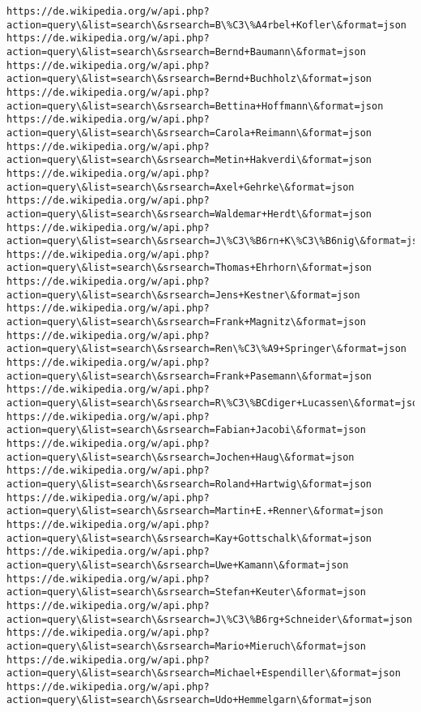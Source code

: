 \documentclass[11pt]{article}
\begin{document}
\begin{Verbatim}[commandchars=\\\{\}]
https://de.wikipedia.org/w/api.php?action=query\&list=search\&srsearch=B\%C3\%A4rbel+Kofler\&format=json
https://de.wikipedia.org/w/api.php?action=query\&list=search\&srsearch=Bernd+Baumann\&format=json
https://de.wikipedia.org/w/api.php?action=query\&list=search\&srsearch=Bernd+Buchholz\&format=json
https://de.wikipedia.org/w/api.php?action=query\&list=search\&srsearch=Bettina+Hoffmann\&format=json
https://de.wikipedia.org/w/api.php?action=query\&list=search\&srsearch=Carola+Reimann\&format=json
https://de.wikipedia.org/w/api.php?action=query\&list=search\&srsearch=Metin+Hakverdi\&format=json
https://de.wikipedia.org/w/api.php?action=query\&list=search\&srsearch=Axel+Gehrke\&format=json
https://de.wikipedia.org/w/api.php?action=query\&list=search\&srsearch=Waldemar+Herdt\&format=json
https://de.wikipedia.org/w/api.php?action=query\&list=search\&srsearch=J\%C3\%B6rn+K\%C3\%B6nig\&format=json
https://de.wikipedia.org/w/api.php?action=query\&list=search\&srsearch=Thomas+Ehrhorn\&format=json
https://de.wikipedia.org/w/api.php?action=query\&list=search\&srsearch=Jens+Kestner\&format=json
https://de.wikipedia.org/w/api.php?action=query\&list=search\&srsearch=Frank+Magnitz\&format=json
https://de.wikipedia.org/w/api.php?action=query\&list=search\&srsearch=Ren\%C3\%A9+Springer\&format=json
https://de.wikipedia.org/w/api.php?action=query\&list=search\&srsearch=Frank+Pasemann\&format=json
https://de.wikipedia.org/w/api.php?action=query\&list=search\&srsearch=R\%C3\%BCdiger+Lucassen\&format=json
https://de.wikipedia.org/w/api.php?action=query\&list=search\&srsearch=Fabian+Jacobi\&format=json
https://de.wikipedia.org/w/api.php?action=query\&list=search\&srsearch=Jochen+Haug\&format=json
https://de.wikipedia.org/w/api.php?action=query\&list=search\&srsearch=Roland+Hartwig\&format=json
https://de.wikipedia.org/w/api.php?action=query\&list=search\&srsearch=Martin+E.+Renner\&format=json
https://de.wikipedia.org/w/api.php?action=query\&list=search\&srsearch=Kay+Gottschalk\&format=json
https://de.wikipedia.org/w/api.php?action=query\&list=search\&srsearch=Uwe+Kamann\&format=json
https://de.wikipedia.org/w/api.php?action=query\&list=search\&srsearch=Stefan+Keuter\&format=json
https://de.wikipedia.org/w/api.php?action=query\&list=search\&srsearch=J\%C3\%B6rg+Schneider\&format=json
https://de.wikipedia.org/w/api.php?action=query\&list=search\&srsearch=Mario+Mieruch\&format=json
https://de.wikipedia.org/w/api.php?action=query\&list=search\&srsearch=Michael+Espendiller\&format=json
https://de.wikipedia.org/w/api.php?action=query\&list=search\&srsearch=Udo+Hemmelgarn\&format=json

\end{Verbatim}
\end{document}
